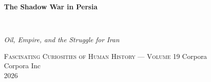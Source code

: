 \clearpage
\vspace*{1.5in}
\begin{center}
  \begin{minipage}{\textwidth}
    \centering
    \Huge\bfseries
    \linespread{1.25}\selectfont
    The Shadow War in Persia
  \end{minipage}
  \\[3em]
  {\Large\itshape\linespread{1.3}\selectfont
  Oil, Empire, and the Struggle for Iran\par}
  \vspace{2em}
  {\small\scshape Fascinating Curiosities of Human History — Volume 19}
  \vfill
  {\large Corpora}
  \\[1em]
  {\large Corpora Inc}
  \\[1em]
  {\large 2026}
\end{center}
\clearpage
